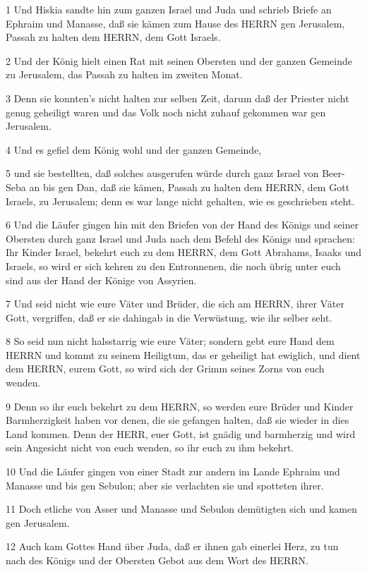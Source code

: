 \par 1 Und Hiskia sandte hin zum ganzen Israel und Juda und schrieb Briefe an Ephraim und Manasse, daß sie kämen zum Hause des HERRN gen Jerusalem, Passah zu halten dem HERRN, dem Gott Israels.
\par 2 Und der König hielt einen Rat mit seinen Obersten und der ganzen Gemeinde zu Jerusalem, das Passah zu halten im zweiten Monat.
\par 3 Denn sie konnten's nicht halten zur selben Zeit, darum daß der Priester nicht genug geheiligt waren und das Volk noch nicht zuhauf gekommen war gen Jerusalem.
\par 4 Und es gefiel dem König wohl und der ganzen Gemeinde,
\par 5 und sie bestellten, daß solches ausgerufen würde durch ganz Israel von Beer-Seba an bis gen Dan, daß sie kämen, Passah zu halten dem HERRN, dem Gott Israels, zu Jerusalem; denn es war lange nicht gehalten, wie es geschrieben steht.
\par 6 Und die Läufer gingen hin mit den Briefen von der Hand des Königs und seiner Obersten durch ganz Israel und Juda nach dem Befehl des Königs und sprachen: Ihr Kinder Israel, bekehrt euch zu dem HERRN, dem Gott Abrahams, Isaaks und Israels, so wird er sich kehren zu den Entronnenen, die noch übrig unter euch sind aus der Hand der Könige von Assyrien.
\par 7 Und seid nicht wie eure Väter und Brüder, die sich am HERRN, ihrer Väter Gott, vergriffen, daß er sie dahingab in die Verwüstung, wie ihr selber seht.
\par 8 So seid nun nicht halsstarrig wie eure Väter; sondern gebt eure Hand dem HERRN und kommt zu seinem Heiligtum, das er geheiligt hat ewiglich, und dient dem HERRN, eurem Gott, so wird sich der Grimm seines Zorns von euch wenden.
\par 9 Denn so ihr euch bekehrt zu dem HERRN, so werden eure Brüder und Kinder Barmherzigkeit haben vor denen, die sie gefangen halten, daß sie wieder in dies Land kommen. Denn der HERR, euer Gott, ist gnädig und barmherzig und wird sein Angesicht nicht von euch wenden, so ihr euch zu ihm bekehrt.
\par 10 Und die Läufer gingen von einer Stadt zur andern im Lande Ephraim und Manasse und bis gen Sebulon; aber sie verlachten sie und spotteten ihrer.
\par 11 Doch etliche von Asser und Manasse und Sebulon demütigten sich und kamen gen Jerusalem.
\par 12 Auch kam Gottes Hand über Juda, daß er ihnen gab einerlei Herz, zu tun nach des Königs und der Obersten Gebot aus dem Wort des HERRN.
